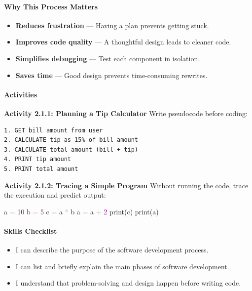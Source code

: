 \documentclass[
  justified,
  openright,
]{tufte-book}
\let\subsubsection\paragraph
\let\paragraph\paragraph
\newcommand{\BuiltInTok}[1]{#1}
\newcommand{\DecValTok}[1]{\textcolor{Purple}{#1}}
\newcommand{\NormalTok}[1]{#1}
\newcommand{\OperatorTok}[1]{\textcolor{DarkGray}{#1}}
\newenvironment{Shaded}{%
  \begin{snugshade}
}{%
  \end{snugshade}
}
\let\subsubsection\paragraph
\let\paragraph\paragraph
\providecommand{\tightlist}{%
  \setlength{\itemsep}{0pt}\setlength{\parskip}{0pt}}
\begin{document}
\subsubsection{Why This Process Matters}\label{why-this-process-matters}

\begin{itemize}
\tightlist
\item
  \textbf{Reduces frustration} --- Having a plan prevents getting stuck.
\item
  \textbf{Improves code quality} --- A thoughtful design leads to
  cleaner code.
\item
  \textbf{Simplifies debugging} --- Test each component in isolation.
\item
  \textbf{Saves time} --- Good design prevents time-consuming rewrites.
\end{itemize}

\subsubsection{Activities}\label{activities-3}

\textbf{Activity 2.1.1: Planning a Tip Calculator} Write pseudocode
before coding:

\begin{verbatim}
1. GET bill amount from user
2. CALCULATE tip as 15% of bill amount
3. CALCULATE total amount (bill + tip)
4. PRINT tip amount
5. PRINT total amount
\end{verbatim}

\textbf{Activity 2.1.2: Tracing a Simple Program} Without running the
code, trace the execution and predict output:

\begin{Shaded}
\begin{Highlighting}[]
\NormalTok{a }\OperatorTok{=} \DecValTok{10}
\NormalTok{b }\OperatorTok{=} \DecValTok{5}
\NormalTok{c }\OperatorTok{=}\NormalTok{ a }\OperatorTok{*}\NormalTok{ b}
\NormalTok{a }\OperatorTok{=}\NormalTok{ a }\OperatorTok{+} \DecValTok{2}
\BuiltInTok{print}\NormalTok{(c)}
\BuiltInTok{print}\NormalTok{(a)}
\end{Highlighting}
\end{Shaded}

\subsubsection{Skills Checklist}\label{skills-checklist-7}

\begin{itemize}
\tightlist
\item[$\square$]
  I can describe the purpose of the software development process.
\item[$\square$]
  I can list and briefly explain the main phases of software
  development.
\item[$\square$]
  I understand that problem-solving and design happen before writing
  code.
\end{itemize}
\end{document}
